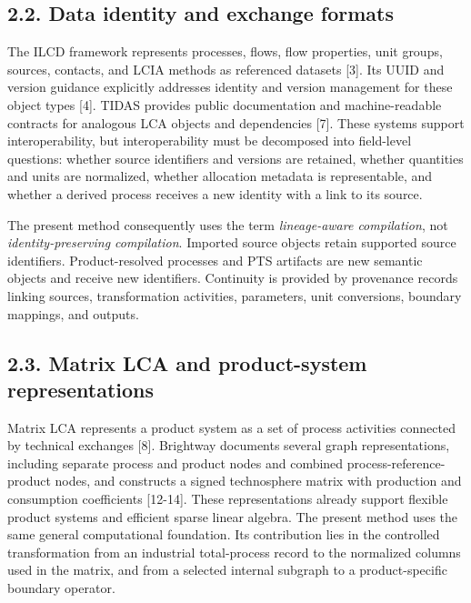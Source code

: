 \documentclass[
  10pt,
  a4paper,
  DIV=11,
  numbers=noendperiod]{scrartcl}
\begin{document}
\subsection{2.2. Data identity and exchange
formats}\label{data-identity-and-exchange-formats}

The ILCD framework represents processes, flows, flow properties, unit
groups, sources, contacts, and LCIA methods as referenced datasets
{[}3{]}. Its UUID and version guidance explicitly addresses identity and
version management for these object types {[}4{]}. TIDAS provides public
documentation and machine-readable contracts for analogous LCA objects
and dependencies {[}7{]}. These systems support interoperability, but
interoperability must be decomposed into field-level questions: whether
source identifiers and versions are retained, whether quantities and
units are normalized, whether allocation metadata is representable, and
whether a derived process receives a new identity with a link to its
source.

The present method consequently uses the term \emph{lineage-aware
compilation}, not \emph{identity-preserving compilation}. Imported
source objects retain supported source identifiers. Product-resolved
processes and PTS artifacts are new semantic objects and receive new
identifiers. Continuity is provided by provenance records linking
sources, transformation activities, parameters, unit conversions,
boundary mappings, and outputs.

\subsection{2.3. Matrix LCA and product-system
representations}\label{matrix-lca-and-product-system-representations}

Matrix LCA represents a product system as a set of process activities
connected by technical exchanges {[}8{]}. Brightway documents several
graph representations, including separate process and product nodes and
combined process-reference-product nodes, and constructs a signed
technosphere matrix with production and consumption coefficients
{[}12-14{]}. These representations already support flexible product
systems and efficient sparse linear algebra. The present method uses the
same general computational foundation. Its contribution lies in the
controlled transformation from an industrial total-process record to the
normalized columns used in the matrix, and from a selected internal
subgraph to a product-specific boundary operator.
\end{document}
